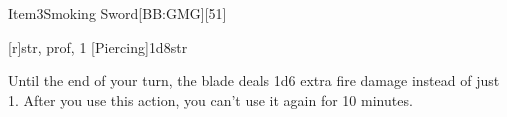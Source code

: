 
\begin{card}{Item}{3}{Smoking Sword}[BB:GMG][51]




[r]{str, prof, 1}
[Piercing]{1d8}{str}



Until the end of your turn, the blade deals 1d6 extra fire damage instead of just 1. After you use this action, you can't use it again for 10 minutes.

\vfill

\end{card}